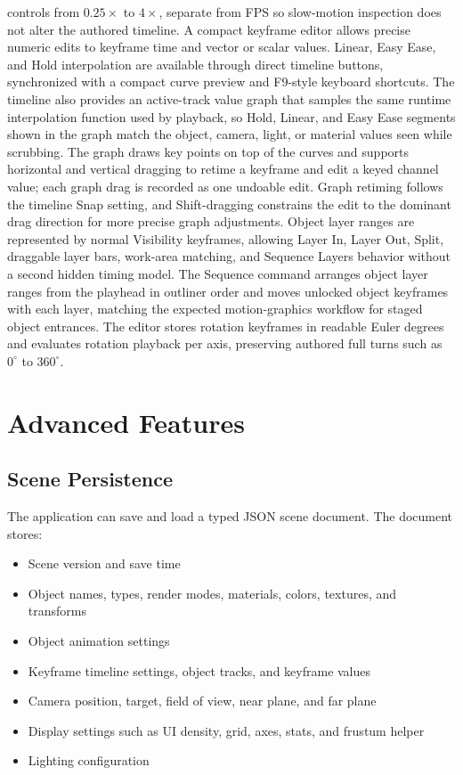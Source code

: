 \documentclass[12pt,a4paper]{article}
\begin{document}
controls from \(0.25\times\) to \(4\times\), separate from FPS so slow-motion
inspection does not alter the authored timeline. A compact keyframe editor
allows precise numeric edits to keyframe time and vector or scalar values.
Linear, Easy Ease, and Hold interpolation are available through direct timeline
buttons, synchronized with a compact curve preview and F9-style keyboard
shortcuts. The timeline also
provides an active-track value graph that samples the same runtime interpolation
function used by playback, so Hold, Linear, and Easy Ease segments shown in the
graph match the object, camera, light, or material values seen while scrubbing.
The graph draws key points on top of the curves and supports horizontal and
vertical dragging to retime a keyframe and edit a keyed channel value; each
graph drag is recorded as one undoable edit. Graph retiming follows the
timeline Snap setting, and Shift-dragging constrains the edit to the dominant
drag direction for more precise graph adjustments.
Object layer ranges are represented by normal Visibility keyframes, allowing
Layer In, Layer Out, Split, draggable layer bars, work-area matching, and
Sequence Layers behavior without a second hidden timing model. The Sequence
command arranges object layer ranges from the playhead in outliner order and
moves unlocked object keyframes with each layer, matching the expected
motion-graphics workflow for staged object entrances.
The editor stores rotation keyframes in readable Euler degrees and evaluates
rotation playback per axis, preserving authored full turns such as \(0^\circ\)
to \(360^\circ\).

\section{Advanced Features}

\subsection{Scene Persistence}

The application can save and load a typed JSON scene document. The document
stores:
\begin{itemize}
  \item Scene version and save time
  \item Object names, types, render modes, materials, colors, textures, and
  transforms
  \item Object animation settings
  \item Keyframe timeline settings, object tracks, and keyframe values
  \item Camera position, target, field of view, near plane, and far plane
  \item Display settings such as UI density, grid, axes, stats, and frustum helper
  \item Lighting configuration
\end{itemize}
\end{document}
